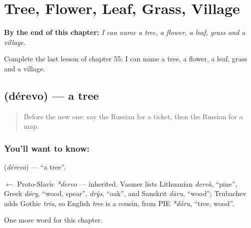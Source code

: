 
\chapter{Tree, Flower, Leaf, Grass, Village}
\label{ch:ru-tree-flower-leaf-grass-village}

\begin{chapteropening}
\textbf{By the end of this chapter:} \emph{I can name a tree, a flower, a leaf, grass and a village.}

Complete the last lesson of chapter 55: I can name a tree, a flower, a leaf, grass and a village.
\end{chapteropening}

\section[\texorpdfstring{\ru{дерево} (dérevo)}{дерево (dérevo)}]{ (dérevo) — a tree}

\label{lesson:RU-C55-tree}



\begin{quote}
Before the new one: say the Russian for a ticket, then the Russian for a map.
\end{quote}

\subsection*{You'll want to know: }
\textbf{} (\emph{dérevo}) — \textquotedblleft{}a tree\textquotedblright{}.

\begin{cousinweb}
\textbf{} $\leftarrow$ Proto-Slavic \emph{*dervo} — inherited. Vasmer lists Lithuanian \emph{dervà}, \textquotedblleft{}pine\textquotedblright{}, Greek \emph{dóry}, \textquotedblleft{}wood, spear\textquotedblright{}, \emph{drŷs}, \textquotedblleft{}oak\textquotedblright{}, and Sanskrit \emph{dāru}, \textquotedblleft{}wood\textquotedblright{}; Trubachev adds Gothic \emph{triu}, so English \emph{tree} is a cousin, from PIE \emph{*dóru}, \textquotedblleft{}tree, wood\textquotedblright{}.
\end{cousinweb}

\begin{grammarlens}[title={What you've built}]
One more word for this chapter.
\end{grammarlens}

